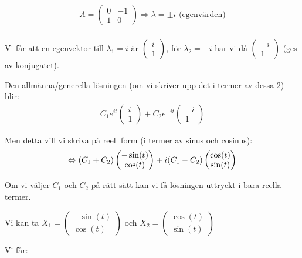 \begin{equation*}
  \begin{gathered}
    A = \begin{pmatrix}0&-1\\1&0\end{pmatrix} \Rightarrow \lambda = \pm i \text{ (egenvärden)}\\
  \end{gathered}
\end{equation*}\par
\noindent Vi får att en egenvektor till $\lambda_1 = i$ är $\begin{pmatrix}i\\1\end{pmatrix}$, för $\lambda_2 = -i$ har vi då $\begin{pmatrix}-i\\1\end{pmatrix}$ (ges av konjugatet).\par
\noindent Den allmänna/generella lösningen (om vi skriver upp det i termer av dessa 2) blir:
\begin{equation*}
  \begin{gathered}
    C_1e^{it}\begin{pmatrix}i\\1\end{pmatrix}+C_2e^{-it}\begin{pmatrix}-i\\1\end{pmatrix}
  \end{gathered}
\end{equation*}\par
\noindent Men detta vill vi skriva på reell form (i termer av sinus och cosinus):
\begin{equation*}
  \begin{gathered}
    \Leftrightarrow (C_1+C_2)\begin{pmatrix}-\sin(t)\\\cos(t)\end{pmatrix}+i(C_1-C_2)\begin{pmatrix}\cos(t)\\\sin(t)\end{pmatrix}
  \end{gathered}
\end{equation*}\par
\noindent Om vi väljer $C_1$ och $C_2$ på rätt sätt kan vi få lösningen uttryckt i bara reella termer.\par
\noindent Vi kan ta $X_1 = \begin{pmatrix}-\sin(t)\\\cos(t)\end{pmatrix}$ och $X_2 = \begin{pmatrix}\cos(t)\\\sin(t)\end{pmatrix}$\par
\noindent Vi får:

